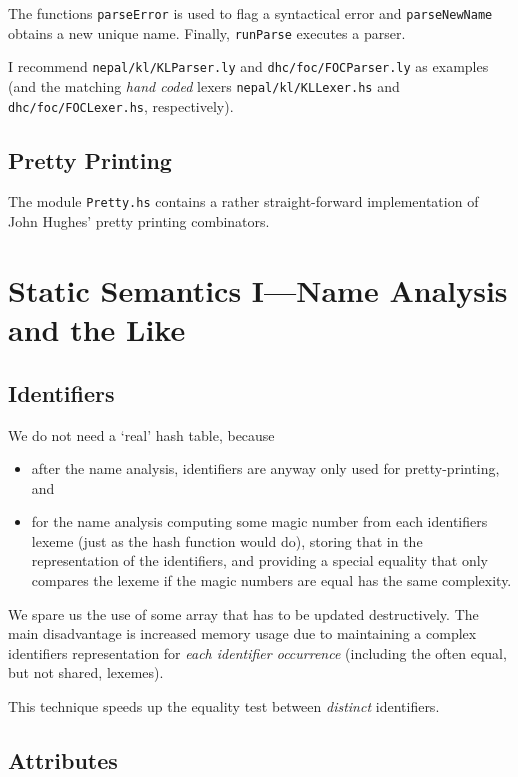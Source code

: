 \documentclass{report}
\newcommand{\code}[1]{\texttt{#1}}
\begin{document}
The functions \code{parseError} is used to flag a syntactical error and
\code{parseNewName} obtains a new unique name.  Finally, \code{runParse}
executes a parser.

I recommend \code{nepal/kl/KLParser.ly} and \code{dhc/foc/FOCParser.ly} as
examples (and the matching \emph{hand coded} lexers \code{nepal/kl/KLLexer.hs}
and \code{dhc/foc/FOCLexer.hs}, respectively).


\section{Pretty Printing}

The module \code{Pretty.hs} contains a rather straight-forward implementation
of John Hughes' pretty printing combinators.


\chapter{Static Semantics I---Name Analysis and the Like}
\label{cha:static1}


\section{Identifiers}
\label{sec:idents}

We do not need a `real' hash table, because
%
\begin{itemize}
\item after the name analysis, identifiers are anyway only used for
  pretty-printing, and
\item for the name analysis computing some magic number from each identifiers
  lexeme (just as the hash function would do), storing that in the
  representation of the identifiers, and providing a special equality that only
  compares the lexeme if the magic numbers are equal has the same complexity.
\end{itemize}
%
We spare us the use of some array that has to be updated destructively. The
main disadvantage is increased memory usage due to maintaining a complex
identifiers representation for {\em each identifier occurrence} (including the
often equal, but not shared, lexemes).

This technique speeds up the equality test between \emph{distinct} identifiers.


\section{Attributes}
\label{sec:attrs}
\end{document}
